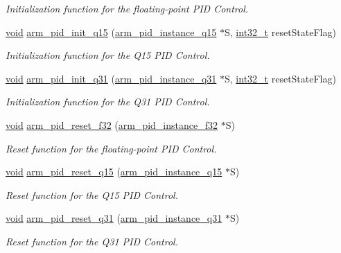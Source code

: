 \begin{DoxyCompactItemize}
\begin{DoxyCompactList}\small\item\em Initialization function for the floating-\/point P\-I\-D Control. \end{DoxyCompactList}\item 
\hyperlink{group___n_a_m_e_ga18028b8badbf1ea7e704ccac3c488e82}{void} \hyperlink{group___p_i_d_ga2cb1e3d3ebb167348fdabec74653d5c3}{arm\-\_\-pid\-\_\-init\-\_\-q15} (\hyperlink{structarm__pid__instance__q15}{arm\-\_\-pid\-\_\-instance\-\_\-q15} $\ast$S, \hyperlink{group___n_a_m_e_gafd12020da5a235dfcf0c3c748fb5baed}{int32\-\_\-t} reset\-State\-Flag)
\begin{DoxyCompactList}\small\item\em Initialization function for the Q15 P\-I\-D Control. \end{DoxyCompactList}\item 
\hyperlink{group___n_a_m_e_ga18028b8badbf1ea7e704ccac3c488e82}{void} \hyperlink{group___p_i_d_gad9d88485234fa9460b1ce9e64989ac86}{arm\-\_\-pid\-\_\-init\-\_\-q31} (\hyperlink{structarm__pid__instance__q31}{arm\-\_\-pid\-\_\-instance\-\_\-q31} $\ast$S, \hyperlink{group___n_a_m_e_gafd12020da5a235dfcf0c3c748fb5baed}{int32\-\_\-t} reset\-State\-Flag)
\begin{DoxyCompactList}\small\item\em Initialization function for the Q31 P\-I\-D Control. \end{DoxyCompactList}\item 
\hyperlink{group___n_a_m_e_ga18028b8badbf1ea7e704ccac3c488e82}{void} \hyperlink{group___p_i_d_ga9ec860bcb6f8ca31205bf0f1b51ab723}{arm\-\_\-pid\-\_\-reset\-\_\-f32} (\hyperlink{structarm__pid__instance__f32}{arm\-\_\-pid\-\_\-instance\-\_\-f32} $\ast$S)
\begin{DoxyCompactList}\small\item\em Reset function for the floating-\/point P\-I\-D Control. \end{DoxyCompactList}\item 
\hyperlink{group___n_a_m_e_ga18028b8badbf1ea7e704ccac3c488e82}{void} \hyperlink{group___p_i_d_ga408566dacb4fa6e0458b2c75672e525f}{arm\-\_\-pid\-\_\-reset\-\_\-q15} (\hyperlink{structarm__pid__instance__q15}{arm\-\_\-pid\-\_\-instance\-\_\-q15} $\ast$S)
\begin{DoxyCompactList}\small\item\em Reset function for the Q15 P\-I\-D Control. \end{DoxyCompactList}\item 
\hyperlink{group___n_a_m_e_ga18028b8badbf1ea7e704ccac3c488e82}{void} \hyperlink{group___p_i_d_gaeecbacd3fb37c608ec25474d3a0dffa9}{arm\-\_\-pid\-\_\-reset\-\_\-q31} (\hyperlink{structarm__pid__instance__q31}{arm\-\_\-pid\-\_\-instance\-\_\-q31} $\ast$S)
\begin{DoxyCompactList}\small\item\em Reset function for the Q31 P\-I\-D Control. \end{DoxyCompactList}\end{DoxyCompactItemize}


